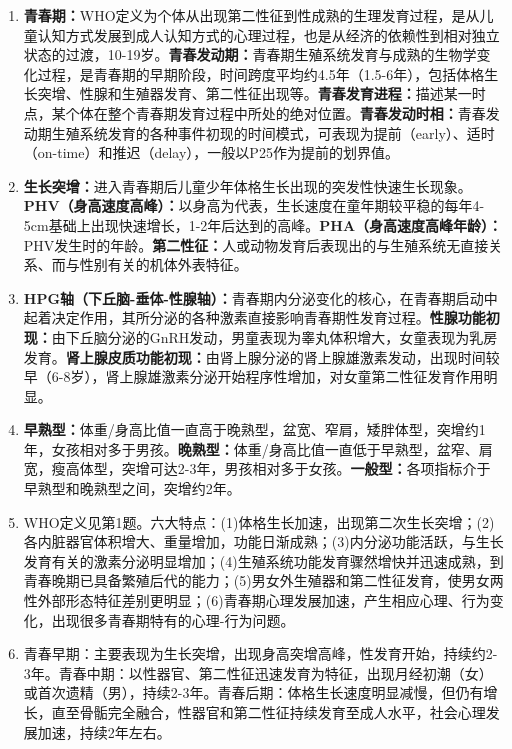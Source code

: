 \begin{enumerate}[leftmargin=*, itemsep=5pt]
    \item \textbf{青春期：}WHO定义为个体从出现第二性征到性成熟的生理发育过程，是从儿童认知方式发展到成人认知方式的心理过程，也是从经济的依赖性到相对独立状态的过渡，10-19岁。\textbf{青春发动期：}青春期生殖系统发育与成熟的生物学变化过程，是青春期的早期阶段，时间跨度平均约4.5年（1.5-6年），包括体格生长突增、性腺和生殖器发育、第二性征出现等。\textbf{青春发育进程：}描述某一时点，某个体在整个青春期发育过程中所处的绝对位置。\textbf{青春发动时相：}青春发动期生殖系统发育的各种事件初现的时间模式，可表现为提前（early）、适时（on-time）和推迟（delay），一般以P25作为提前的划界值。

    \item \textbf{生长突增：}进入青春期后儿童少年体格生长出现的突发性快速生长现象。\textbf{PHV（身高速度高峰）：}以身高为代表，生长速度在童年期较平稳的每年4-5cm基础上出现快速增长，1-2年后达到的高峰。\textbf{PHA（身高速度高峰年龄）：}PHV发生时的年龄。\textbf{第二性征：}人或动物发育后表现出的与生殖系统无直接关系、而与性别有关的机体外表特征。

    \item \textbf{HPG轴（下丘脑-垂体-性腺轴）：}青春期内分泌变化的核心，在青春期启动中起着决定作用，其所分泌的各种激素直接影响青春期性发育过程。\textbf{性腺功能初现：}由下丘脑分泌的GnRH发动，男童表现为睾丸体积增大，女童表现为乳房发育。\textbf{肾上腺皮质功能初现：}由肾上腺分泌的肾上腺雄激素发动，出现时间较早（6-8岁），肾上腺雄激素分泌开始程序性增加，对女童第二性征发育作用明显。

    \item \textbf{早熟型：}体重/身高比值一直高于晚熟型，盆宽、窄肩，矮胖体型，突增约1年，女孩相对多于男孩。\textbf{晚熟型：}体重/身高比值一直低于早熟型，盆窄、肩宽，瘦高体型，突增可达2-3年，男孩相对多于女孩。\textbf{一般型：}各项指标介于早熟型和晚熟型之间，突增约2年。

    \item WHO定义见第1题。六大特点：(1)体格生长加速，出现第二次生长突增；(2)各内脏器官体积增大、重量增加，功能日渐成熟；(3)内分泌功能活跃，与生长发育有关的激素分泌明显增加；(4)生殖系统功能发育骤然增快并迅速成熟，到青春晚期已具备繁殖后代的能力；(5)男女外生殖器和第二性征发育，使男女两性外部形态特征差别更明显；(6)青春期心理发展加速，产生相应心理、行为变化，出现很多青春期特有的心理-行为问题。

    \item 青春早期：主要表现为生长突增，出现身高突增高峰，性发育开始，持续约2-3年。青春中期：以性器官、第二性征迅速发育为特征，出现月经初潮（女）或首次遗精（男），持续2-3年。青春后期：体格生长速度明显减慢，但仍有增长，直至骨骺完全融合，性器官和第二性征持续发育至成人水平，社会心理发展加速，持续2年左右。


\end{enumerate}
